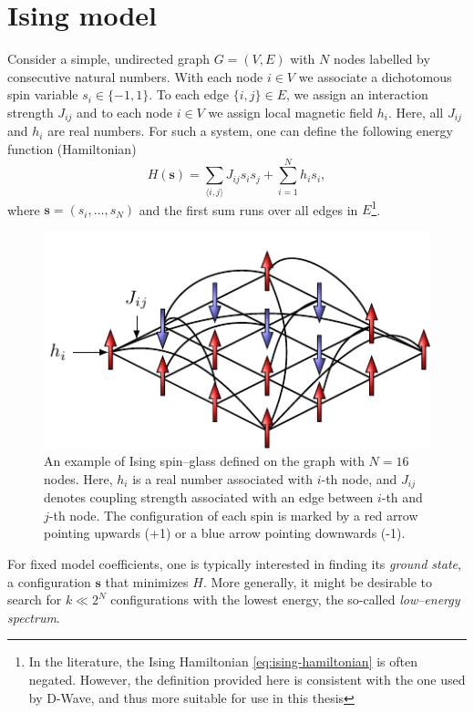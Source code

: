 \section{Ising model}
Consider a simple, undirected graph $G = (V, E)$ with $N$ nodes labelled by consecutive natural numbers. With each node $i \in V$ we associate a dichotomous spin variable $s_i \in \{-1, 1\}$. To each edge $\{i, j\} \in E$, we assign an interaction strength $J_{ij}$ and to each node $i \in V$ we assign local magnetic field $h_i$. Here, all $J_{ij}$ and $h_i$ are real numbers. For such a system, one can define the following energy function (Hamiltonian)
\begin{equation}
\label{eq:ising-hamiltonian}
H(\mathbf{s}) = \sum_{\langle i, j \rangle} J_{ij} s_i s_j +  \sum_{i=1}^N h_i s_i,
\end{equation}
where $\mathbf{s} = (s_i, \ldots, s_N)$ and the first sum runs over all edges in $E$\footnote{In the literature, the Ising Hamiltonian \eqref{eq:ising-hamiltonian} is often negated. However, the definition provided here is consistent with the one used by D-Wave, and thus more suitable for use in this thesis}.
\begin{figure}
    \centering
    \includegraphics{figures/spins.pdf}
    \caption{An example of Ising spin--glass defined on the graph with $N=16$ nodes. Here, $h_i$ is a real number associated with $i$-th node, and $J_{ij}$ denotes coupling strength associated with an edge between $i$-th and $j$-th node. The configuration of each spin is marked by a red arrow pointing upwards (+1) or a blue arrow pointing downwards (-1).}
    \label{fig:my_label}
\end{figure}
For fixed model coefficients, one is typically interested in finding its \emph{ground state}, a configuration $\mathbf{s}$ that minimizes $H$. More generally, it might be desirable to search for $k \ll 2^N$ configurations with the lowest energy, the so-called \emph{low--energy spectrum}.

